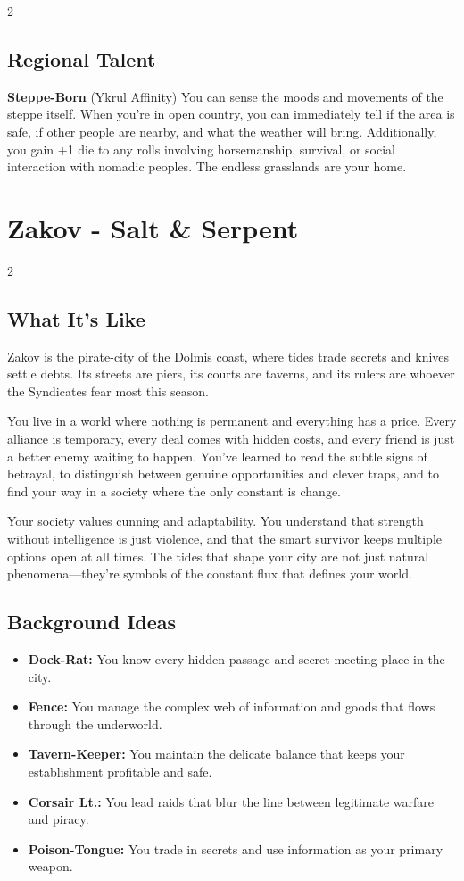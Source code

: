 \documentclass[11pt]{article}
\newcommand{\region}[1]{\section*{#1}}
\newcommand{\subregion}[1]{\subsection*{#1}}
\begin{document}
\begin{multicols}{2}
\subregion{Regional Talent}

\textbf{Steppe-Born} (Ykrul Affinity)
You can sense the moods and movements of the steppe itself. When you're in open country, you can immediately tell if the area is safe, if other people are nearby, and what the weather will bring. Additionally, you gain +1 die to any rolls involving horsemanship, survival, or social interaction with nomadic peoples. The endless grasslands are your home.

\end{multicols}

\region{Zakov - Salt \& Serpent}

\begin{multicols}{2}
\subregion{What It's Like}

Zakov is the pirate-city of the Dolmis coast, where tides trade secrets and knives settle debts. Its streets are piers, its courts are taverns, and its rulers are whoever the Syndicates fear most this season.

You live in a world where nothing is permanent and everything has a price. Every alliance is temporary, every deal comes with hidden costs, and every friend is just a better enemy waiting to happen. You've learned to read the subtle signs of betrayal, to distinguish between genuine opportunities and clever traps, and to find your way in a society where the only constant is change.

Your society values cunning and adaptability. You understand that strength without intelligence is just violence, and that the smart survivor keeps multiple options open at all times. The tides that shape your city are not just natural phenomena---they're symbols of the constant flux that defines your world.

\columnbreak

\subregion{Background Ideas}

\begin{itemize}[leftmargin=*]
    \item \textbf{Dock-Rat:} You know every hidden passage and secret meeting place in the city.
    \item \textbf{Fence:} You manage the complex web of information and goods that flows through the underworld.
    \item \textbf{Tavern-Keeper:} You maintain the delicate balance that keeps your establishment profitable and safe.
    \item \textbf{Corsair Lt.:} You lead raids that blur the line between legitimate warfare and piracy.
    \item \textbf{Poison-Tongue:} You trade in secrets and use information as your primary weapon.
\end{itemize}


\end{multicols}
\end{document}
